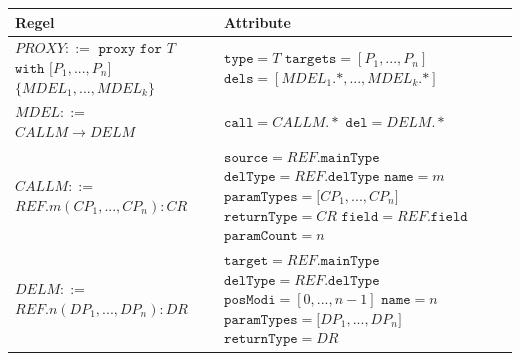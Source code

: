 \documentclass[a4paper,12pt]{article}
\begin{document}
\begin{table}[H]
\centering
\begin{tabular}{|p{6cm}|p{8cm}|}
\hline
\hline
\centering\textbf{Regel} & \textbf{Attribute} \\
\hline
\hline
$\mathit{PROXY} ::=$\newline
$\texttt{proxy } \texttt{for } T$\newline
$ \texttt{with [}\mathit{P_1},...,\mathit{P_n}\texttt{]}$ \newline
$\texttt{\{}\mathit{MDEL_1},...,\mathit{MDEL_k} \texttt{\}}$
& 
$\texttt{type} = \mathit{T}$\newline
$\texttt{targets} = [\mathit{P_1},...,\mathit{P_n}]$\newline
$\texttt{dels} = [\mathit{MDEL_1}\texttt{.}\text{*},...,\mathit{MDEL_k}\texttt{.}\text{*}]$
\\
\hline
$\mathit{MDEL} ::=$\newline
$\mathit{CALLM} \rightarrow \mathit{DELM} $  
& 
$\texttt{call} = \mathit{CALLM}.*$\newline
$\texttt{del} = \mathit{DELM}.*$
\\
\hline
$\mathit{CALLM} ::=$\newline 
$\mathit{REF}.\mathit{m(\mathit{CP_1},...,\mathit{CP_n}):CR}$
& 
$\texttt{source} = \mathit{REF.\texttt{mainType}}$\newline
$\texttt{delType} = \mathit{REF.\texttt{delType}}$\newline
$\texttt{name} = \mathit{m}$\newline
$\texttt{paramTypes} = \mathit{[CP_1},...,\mathit{CP_n]}$\newline
$\texttt{returnType} = \mathit{CR}$\newline
$\texttt{field} = \mathit{REF}\texttt{.field}$\newline
$\texttt{paramCount} = n$
\\
\hline
$\mathit{DELM} ::=$\newline 
$\mathit{REF}\texttt{.}n(\mathit{DP_1},...,\mathit{DP_n}):DR $  
&
$\texttt{target} = \mathit{REF}.\texttt{mainType}$\newline
$\texttt{delType} = \mathit{REF}.\texttt{delType}$\newline
$\texttt{posModi} = [0,...,\mathit{n}-1]$\newline
$\texttt{name} = \mathit{n}$\newline
$\texttt{paramTypes} = \mathit{[DP_1},...,\mathit{DP_n]}$\newline
$\texttt{returnType} = \mathit{DR}$\newline

\end{tabular}
\end{table}
\end{document}

